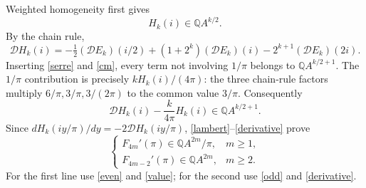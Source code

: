 \documentclass[11pt]{article}
\newcommand{\Q}{\mathbb Q}
\newcommand{\D}{\mathcal D}
\begin{document}
Weighted homogeneity first gives
\begin{equation}
 H_k(i)\in\Q A^{k/2}.                                \label{value}
\end{equation}
By the chain rule,
\[
 \D H_k(i)=-\tfrac12(\D E_k)(i/2)
          +(1+2^k)(\D E_k)(i)-2^{k+1}(\D E_k)(2i).
\]
Inserting \eqref{serre} and \eqref{cm}, every term not involving $1/\pi$
belongs to $\Q A^{k/2+1}$. The $1/\pi$ contribution is precisely
$kH_k(i)/(4\pi)$: the three chain-rule factors multiply
$6/\pi,3/\pi,3/(2\pi)$ to the common value $3/\pi$.
Consequently
\begin{equation}
 \D H_k(i)-\frac{k}{4\pi}H_k(i)\in\Q A^{k/2+1}.
                                                               \label{derivative}
\end{equation}
Since $dH_k(iy/\pi)/dy=-2\D H_k(iy/\pi)$,
\eqref{lambert}--\eqref{derivative} prove
\begin{equation}
 \begin{cases}
 F_{4m}'(\pi)\in\Q A^{2m}/\pi,&m\geq1,\\
 F_{4m-2}'(\pi)\in\Q A^{2m},&m\geq2.
 \end{cases}                                                   \label{purity}
\end{equation}
For the first line use \eqref{even} and \eqref{value};
for the second use \eqref{odd} and \eqref{derivative}.
\end{document}
